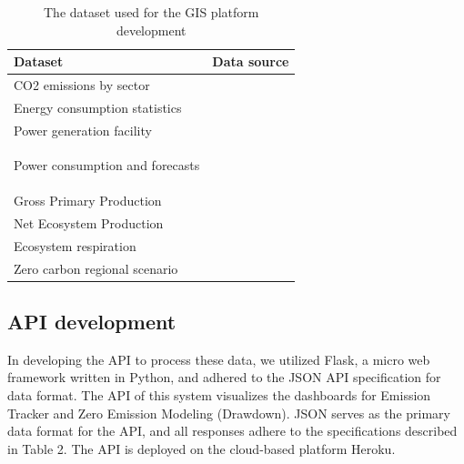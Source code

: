 \begin{table}[!ht]
    \centering
    \caption{The dataset used for the GIS platform development}
    \begin{adjustbox}{width=\textwidth}
        \begin{tabular}{l l}
        \hline
            Dataset & Data source \\ \hline
            CO2 emissions by sector & \citep{env2022} \\ \hline
            Energy consumption statistics & \citep{Toshihiko} \\ \hline
            Power generation facility & \citep{nlftp} \\ \hline
            \multirow{10}{*}{Power consumption and forecasts} & \citep{hokkaido} \\
            ~ & \citep{tohoku} \\
            ~ & \citep{Tokyo} \\
            ~ & \citep{Chubu} \\
            ~ & \citep{Hokuriku} \\
            ~ & \citep{Kansai} \\
            ~ & \citep{Chugoku} \\
            ~ & \citep{Shikoku} \\
            ~ & \citep{Kyushu} \\
            ~ & \citep{Okinawa} \\ \hline
            Gross Primary Production & \multirow{3}{*}{\citep{ito2019disequilibrium}} \\
            Net Ecosystem Production & ~ \\
            Ecosystem respiration & ~ \\ \hline
            Zero carbon regional scenario & \citep{zerocarbon} \\
            \hline
        \end{tabular}
    \end{adjustbox}
    \label{tab:chap7_tab1}
\end{table}

\subsection{API development}
In developing the API to process these data, we utilized Flask, a micro web framework written in Python, and adhered to the JSON API specification for data format. The API of this system visualizes the dashboards for Emission Tracker and Zero Emission Modeling (Drawdown). JSON serves as the primary data format for the API, and all responses adhere to the specifications described in Table 2. The API is deployed on the cloud-based platform Heroku. \par


